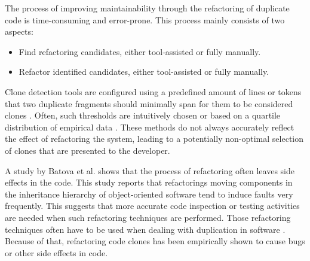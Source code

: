 The process of improving maintainability through the refactoring of duplicate code is time-consuming and error-prone. This process mainly consists of two aspects:
\begin{itemize}
	\item Find refactoring candidates, either tool-assisted or fully manually.
	\item Refactor identified candidates, either tool-assisted or fully manually.
\end{itemize}
Clone detection tools are configured using a predefined amount of lines or tokens that two duplicate fragments should minimally span for them to be considered clones \cite{sajnani2016sourcerercc, svajlenko2016bigcloneeval}. Often, such thresholds are intuitively chosen \cite{li2006cp, roy2009mutation} or based on a quartile distribution of empirical data \cite{alves2010deriving}. These methods do not always accurately reflect the effect of refactoring the system, leading to a potentially non-optimal selection of clones that are presented to the developer.

A study by Batova et al. \cite{bavota2012does} shows that the process of refactoring often leaves side effects in the code. This study reports that refactorings moving components in the inheritance hierarchy of object-oriented software tend to induce faults very frequently. This suggests that more accurate code inspection or testing activities are needed when such refactoring techniques are performed. Those refactoring techniques often have to be used when dealing with duplication in software \cite{fowler2018refactoring, fontana2015duplicated}. Because of that, refactoring code clones has been empirically shown to cause bugs or other side effects in code.

